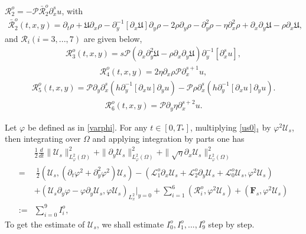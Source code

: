 \documentclass{amsart}
\numberwithin{equation}{section}
\begin{document}
$\mathcal{R}_{2}^{o}=-\mathcal{P}\bar{\mathcal{R}}_{2}^{o}\partial_{x}^{s}u$, with
\begin{align*}
\bar{\mathcal{R}}_{2}^{o}(t,x,y)
= \partial_{t}\rho+\mathfrak{U}\partial_{x}\rho-\partial_{y}^{-1}[\partial_{x}\mathfrak{U}]\partial_{y}\rho-2\rho\partial_{y}\rho
 -\partial_{y}^{2}\rho-\eta\partial_{x}^{2}\rho+\partial_{x}\partial_{y}\mathfrak{U}-\rho\partial_{x}\mathfrak{U},
\end{align*}
and $\mathcal{R}_{i}(i=3,...,7)$ are given below,
\begin{align*}
\mathcal{R}_{3}^{o}(t,x,y)
=s\mathcal{P}\left(\partial_{x}\partial_{y}^{2}\mathfrak{U}-\rho\partial_{x}\partial_{y}\mathfrak{U}\right)\partial_{y}^{-1}[\partial_{x}^{s}u],
\end{align*}
\begin{align*}
\mathcal{R}_{4}^{o}(t,x,y)
=2\eta\partial_{x}\rho\mathcal{P}\partial_{x}^{s+1}u,
\end{align*}
\begin{align*}
\mathcal{R}_{5}^{o}(t,x,y)
= \mathcal{P}\partial_{y}\partial_{x}^{s}(h\partial_{y}^{-1}[\partial_{x}u]\partial_{y}u)
 -\mathcal{P}\rho\partial_{x}^{s}(h\partial_{y}^{-1}[\partial_{x}u]\partial_{y}u).
\end{align*}
\begin{align*}
\mathcal{R}_{6}^{o}(t,x,y)
= \mathcal{P}\partial_{y}\eta\partial_{x}^{s+2}u.
\end{align*}

Let $\varphi$ be defined as in \eqref{varphi}. For any $t\in[0,T_{*}]$, multiplying \eqref{us0}$_{1}$ by $\varphi^{2} \mathcal{U}_{s}$, then integrating over $\Omega$ and applying integration by parts one has
\begin{align}\label{he0}
&\frac{1}{2}\frac{d}{dt}\|\mathcal{U}_{s}\|_{L_{\varphi}^{2}(\Omega)}^{2}
+\|\partial_{y}\mathcal{U}_{s}\|_{L_{\varphi}^{2}(\Omega)}^{2}
+\|\sqrt{\eta}\partial_{x}\mathcal{U}_{s}\|_{L_{\varphi}^{2}(\Omega)}^{2}\\
=&~\frac{1}{2}(\mathcal{U}_{s},(\partial_{t}\varphi^{2}+\partial_{y}^{2}\varphi^{2})\mathcal{U}_{s})
  -(\mathcal{L}_{1}^{o}\partial_{x}\mathcal{U}_{s}+\mathcal{L}_{2}^{o}\partial_{y}\mathcal{U}_{s}+\mathcal{L}_{0}^{o}\mathcal{U}_{s},\varphi^{2}\mathcal{U}_{s})\nonumber\\
 &+(\mathcal{U}_{s}\partial_{y}\varphi-\varphi\partial_{y}\mathcal{U}_{s},\varphi\mathcal{U}_{s})_{L_{x}^{2}}|_{y=0}
  +\sum_{i=1}^{6}(\mathcal{R}_{i}^{o},\varphi^{2}\mathcal{U}_{s})
  +(\mathbf{F}_{s},\varphi^{2}\mathcal{U}_{s})\nonumber\\
:=&\sum_{i=0}^{9}I_{i}^{o},\nonumber
\end{align}
To get the estimate of $\mathcal{U}_{s}$, we shall estimate $I_{0}^{o},I_{1}^{o},...,I_{9}^{o}$ step by step.
\end{document}
